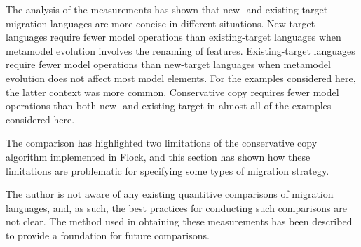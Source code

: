 The analysis of the measurements has shown that new- and existing-target migration languages are more concise in different situations. New-target languages require fewer model operations than existing-target languages when metamodel evolution involves the renaming of features. Existing-target languages require fewer model operations than new-target languages when metamodel evolution does not affect most model elements. For the examples considered here, the latter context was more common. Conservative copy requires fewer model operations than both new- and existing-target in almost all of the examples considered here.

The comparison has highlighted two limitations of the conservative copy algorithm implemented in Flock, and this section has shown how these limitations are problematic for specifying some types of migration strategy.

The author is not aware of any existing quantitive comparisons of migration languages, and, as such, the best practices for conducting such comparisons are not clear. The method used in obtaining these measurements has been described to provide a foundation for future comparisons. 
